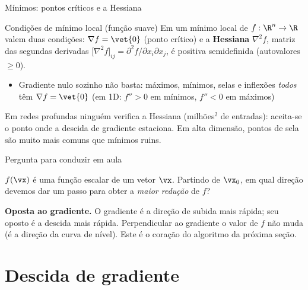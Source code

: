 \documentclass[aspectratio=169, 11pt]{beamer}
\begin{document}
\begin{frame}{Mínimos: pontos críticos e a Hessiana}
  \begin{teobox}{Condições de mínimo local (função suave)}
    Em um mínimo local de $f : \R^n \to \R$ valem duas condições:
    \(\nabla f = \vet{0}\) (ponto crítico) e a \textbf{Hessiana}
    \(\nabla^2 f\), matriz das segundas derivadas
    \(\big[\nabla^2 f\big]_{ij} = \partial^2 f / \partial x_i \partial x_j\),
    é \alert{positiva semidefinida} (autovalores $\geq 0$).
  \end{teobox}

  \begin{itemize}\setlength{\itemsep}{0.2ex}
    \item Gradiente nulo sozinho não basta: máximos, mínimos, selas e inflexões
          \emph{todos} têm $\nabla f = \vet{0}$ (em 1D: $f''>0$ em mínimos,
          $f''<0$ em máximos)
  \end{itemize}

  \begin{alertabox}
    Em redes profundas ninguém verifica a Hessiana (milhões$^2$ de entradas):
    aceita-se o ponto onde a descida de gradiente estaciona. Em alta dimensão,
    pontos de \alert{sela} são muito mais comuns que mínimos ruins.
  \end{alertabox}
\end{frame}

\begin{frame}{Pergunta para conduzir em aula}
  \begin{quizbox}
    $f(\vx)$ é uma função escalar de um vetor $\vx$. Partindo de $\vx_0$, em qual
    direção devemos dar um passo para obter a \emph{maior redução} de $f$?

    \smallskip
  \end{quizbox}

  \pause

  \begin{respbox}
    \textbf{Oposta ao gradiente.} O gradiente é a direção de subida mais rápida;
    seu oposto é a descida mais rápida. Perpendicular ao gradiente o valor de $f$
    não muda (é a direção da curva de nível). Este é o coração do algoritmo da
    próxima seção.
  \end{respbox}
\end{frame}

\section{Descida de gradiente}
\end{document}
